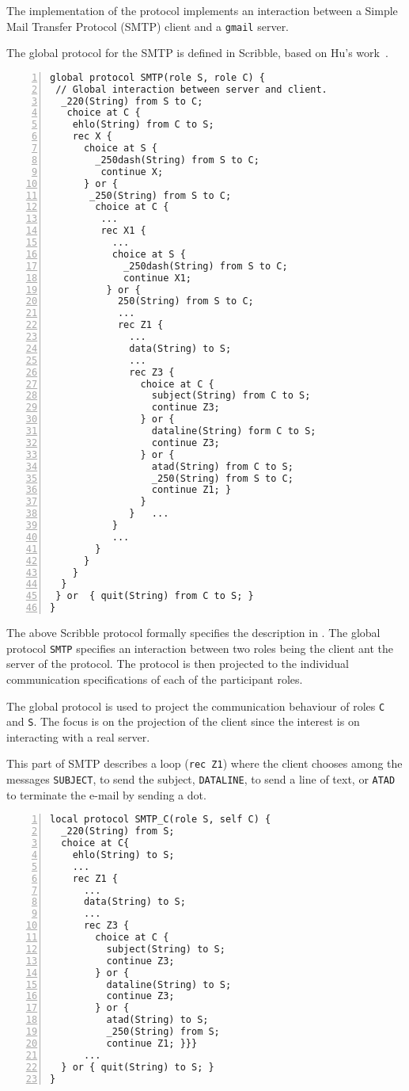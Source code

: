 The implementation of the protocol implements an interaction between
a Simple Mail Transfer Protocol (SMTP) client and a \lstinline|gmail| server.


The global protocol for the SMTP is defined in Scribble, 
based on Hu's work~\cite{HuR:smtp}.

\begin{lstlisting}[numbers=left]
global protocol SMTP(role S, role C) {
 // Global interaction between server and client.
  _220(String) from S to C;
   choice at C {
    ehlo(String) from C to S;
    rec X {
      choice at S {
        _250dash(String) from S to C;
         continue X;
      } or {
       _250(String) from S to C;
        choice at C {
         ...
         rec X1 {
           ...
           choice at S {
             _250dash(String) from S to C;
             continue X1;
          } or {
            250(String) from S to C;
            ...
            rec Z1 {
              ...
              data(String) to S;
              ...
              rec Z3 {
                choice at C {
                  subject(String) from C to S;
                  continue Z3;
                } or {
                  dataline(String) form C to S;
                  continue Z3;
                } or {
                  atad(String) from C to S;
                  _250(String) from S to C;
                  continue Z1; }
                }
              }   ...  
           }  
           ... 
        }
      }
    }
  }
 } or  { quit(String) from C to S; }
}
\end{lstlisting}


The above Scribble protocol formally specifies
the description in .
The global protocol \lstinline|SMTP| specifies
an interaction between two roles being the client ant the server of the protocol.
The protocol is then projected to the
individual communication specifications of each 
of the participant roles.

The global protocol is used to project the communication
behaviour of roles \lstinline|C| and \lstinline|S|.
The focus is on the projection of the client
since the interest is on interacting with a real server.

This part of SMTP describes a loop (\lstinline|rec Z1|) where the client chooses
among the messages \lstinline|SUBJECT|, to send the subject,
\lstinline|DATALINE|, to send a line of text, or \lstinline|ATAD| to terminate the e-mail by sending a dot.

\begin{lstlisting}[numbers=left]
local protocol SMTP_C(role S, self C) {
  _220(String) from S;
  choice at C{
    ehlo(String) to S;
    ...
    rec Z1 {
      ...
      data(String) to S;
      ...
      rec Z3 {
        choice at C {
          subject(String) to S;
          continue Z3;
        } or {
          dataline(String) to S;
          continue Z3;
        } or {
          atad(String) to S;
          _250(String) from S;
          continue Z1; }}}
      ...
  } or { quit(String) to S; }
}
\end{lstlisting}
%

